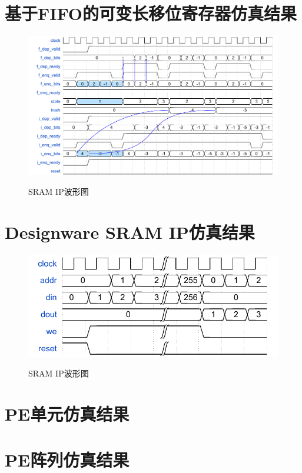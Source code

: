 \section{基于FIFO的可变长移位寄存器仿真结果}
\begin{figure}[h]
    \centering
    \includegraphics[scale=0.7]{../pdf/shift_w.pdf}\\
    \caption{SRAM IP波形图}
\end{figure}

\section{Designware SRAM IP仿真结果}
\begin{figure}[h]
    \centering
    \includegraphics{../pdf/sram_w.pdf}\\
    \caption{SRAM IP波形图}
\end{figure}

\section{PE单元仿真结果}

\section{PE阵列仿真结果}

